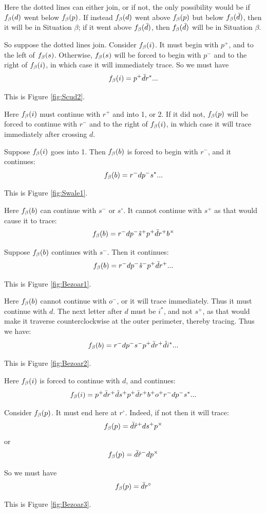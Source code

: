 Here the dotted lines can either join, or if not, the only possibility would be if $f_\beta(d)$ went below $f_\beta(p)$. If instead $f_\beta(d)$ went above $f_\beta(p)$ but below $f_\beta(\bar{d})$, then it will be in Situation $\beta$; if it went above $f_\beta(\bar{d})$, then $f_\beta(\bar{d})$ will be in Situation $\beta$.

So suppose the dotted lines join. Consider $f_\beta(i)$. It must begin with $p^+$, and to the left of $f_\beta(s)$. Otherwise, $f_\beta(s)$ will be forced to begin with $p^-$ and to the right of $f_\beta(i)$, in which case it will immediately trace. So we must have
\[
f_\beta(i) = p^+ \bar{d} r^*...
\]

This is Figure \ref{fig:Scud2}.

Here $f_\beta(i)$ must continue with $r^+$ and into 1, or 2. If it did not, $f_\beta(p)$ will be forced to continue with $r^-$ and to the right of $f_\beta(i)$, in which case it will trace immediately after crossing $d$.

 \label{Swale}
Suppose $f_\beta(i)$ goes into 1. Then $f_\beta(b)$ is forced to begin with $r^-$, and it continues:
\[
f_\beta(b) = r^- d p^- s^*...
\]

This is Figure \ref{fig:Swale1}.

Here $f_\beta(b)$ can continue with $s^-$ or $s^\circ$. It cannot continue with $s^+$ as that would cause it to trace:
\[
f_\beta(b) = r^- d p^- \hat{s}^+ p^+ \bar{d} r^+ b^\times
\]


\label{Bezoar}
Suppose $f_\beta(b)$ continues with $s^-$. Then it continues:
\[
f_\beta(b) = r^- d p^- \hat{s}^- p^+ \bar{d} r^+...
\]

This is Figure \ref{fig:Bezoar1}.

Here $f_\beta(b)$ cannot continue with $o^-$, or it will trace immediately. Thus it must continue with $d$. The next letter after $d$ must be $i^*$, and not $s^+$, as that would make it traverse counterclockwise at the outer perimeter, thereby tracing. Thus we have:
\[
f_\beta(b) = r^- d p^- s^- p^+ \bar{d} r^+ \hat{d} i^*...
\]

This is Figure \ref{fig:Bezoar2}.

Here $f_\beta(i)$ is forced to continue with $d$, and continues:
\[
f_\beta(i) = p^+ \bar{d} r^+ \hat{d} s^+ p^+ \bar{d} r^+ b^+ o^+ r^- d p^- s^*...
\]

Consider $f_\beta(p)$. It must end here at $r^\circ$. Indeed, if not then it will trace:
\[
f_\beta(p) = \bar{d} \hat{r}^+ d s^+ p^\times
\]
or
\[
f_\beta(p) = \bar{d} \hat{r}^- d p^\times
\]

So we must have
\[
f_\beta(p) = \bar{d} r^\circ
\]

This is Figure \ref{fig:Bezoar3}.

